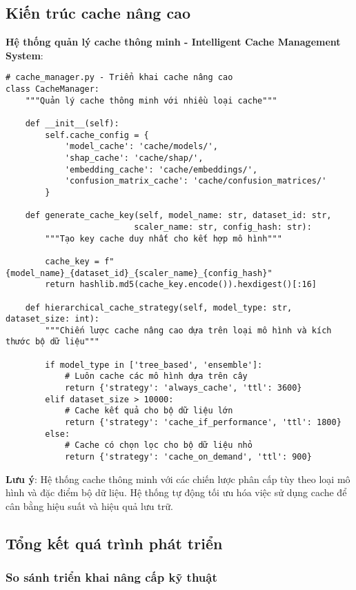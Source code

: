 \subsection{Kiến trúc cache nâng cao}

\textbf{Hệ thống quản lý cache thông minh - Intelligent Cache Management System}:

\begin{verbatim}
# cache_manager.py - Triển khai cache nâng cao
class CacheManager:
    """Quản lý cache thông minh với nhiều loại cache"""
    
    def __init__(self):
        self.cache_config = {
            'model_cache': 'cache/models/',
            'shap_cache': 'cache/shap/',
            'embedding_cache': 'cache/embeddings/',
            'confusion_matrix_cache': 'cache/confusion_matrices/'
        }
        
    def generate_cache_key(self, model_name: str, dataset_id: str, 
                          scaler_name: str, config_hash: str):
        """Tạo key cache duy nhất cho kết hợp mô hình"""
        
        cache_key = f"{model_name}_{dataset_id}_{scaler_name}_{config_hash}"
        return hashlib.md5(cache_key.encode()).hexdigest()[:16]
    
    def hierarchical_cache_strategy(self, model_type: str, dataset_size: int):
        """Chiến lược cache nâng cao dựa trên loại mô hình và kích thước bộ dữ liệu"""
        
        if model_type in ['tree_based', 'ensemble']:
            # Luôn cache các mô hình dựa trên cây
            return {'strategy': 'always_cache', 'ttl': 3600}
        elif dataset_size > 10000:
            # Cache kết quả cho bộ dữ liệu lớn
            return {'strategy': 'cache_if_performance', 'ttl': 1800}
        else:
            # Cache có chọn lọc cho bộ dữ liệu nhỏ
            return {'strategy': 'cache_on_demand', 'ttl': 900}
\end{verbatim}

\textbf{Lưu ý}: Hệ thống cache thông minh với các chiến lược phân cấp tùy theo loại mô hình và đặc điểm bộ dữ liệu. Hệ thống tự động tối ưu hóa việc sử dụng cache để cân bằng hiệu suất và hiệu quả lưu trữ.

\subsection{Tổng kết quá trình phát triển}

\subsubsection{So sánh triển khai nâng cấp kỹ thuật}

